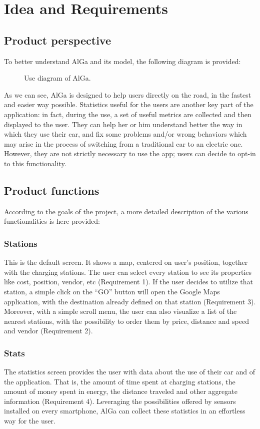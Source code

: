 \chapter{Idea and Requirements}
\label{chap:ideaAndRequirements}
\section{Product perspective}
To better understand AlGa and its model, the following diagram is provided:
\begin{figure}[H]
\caption{Use diagram of AlGa.}
\end{figure}
As we can see, AlGa is designed to help users directly on the road, in the fastest and easier way possible. Statistics useful for the users are another key part of the application: in fact, during the use, a set of useful metrics are collected and then displayed to the user. They can help her or him understand better the way in which they use their car, and fix some problems and/or wrong behaviors which may arise in the process of switching from a traditional car to an electric one. However, they are not strictly necessary to use the app; users can decide to opt-in to this functionality.
		
\section{Product functions}
According to the goals of the project, a more detailed description of the various functionalities is here provided:

\subsection*{Stations}
This is the default screen. It shows a map, centered on user's position, together with the charging stations. The user can select every station to see its properties like cost, position, vendor, etc (Requirement 1). If the user decides to utilize that station, a simple click on the ``GO'' button will open the Google Maps application, with the destination already defined on that station (Requirement 3).
Moreover, with a simple scroll menu, the user can also visualize a list of the nearest stations, with the possibility to order them by price, distance and speed and vendor (Requirement 2).

\subsection*{Stats}
The statistics screen provides the user with data about the use of their car and of the application. That is, the amount of time spent at charging stations, the amount of money spent in energy, the distance traveled and other aggregate information (Requirement 4). Leveraging the possibilities offered by sensors installed on every smartphone, AlGa can collect these statistics in an effortless way for the user.

